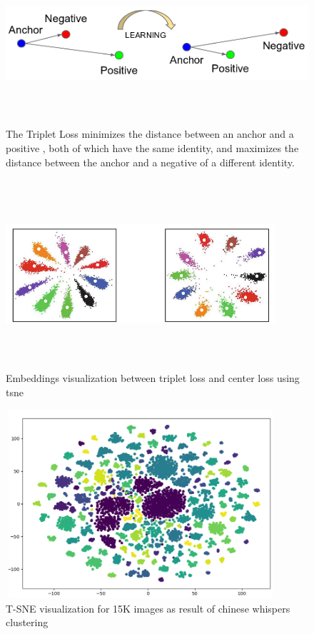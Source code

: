\documentclass[a4paper,12pt, twoside]{NITKReport}
\begin{document}
\begin{figure}[h]
\centering
    \includegraphics[height=6cm,width=13cm]{Selection_034.png}
    \caption{The Triplet Loss minimizes the distance between an anchor and a positive , both of which have the same identity, and maximizes the distance between the anchor and a negative of a different identity.}
    \label{triplet}
 
\end{figure}

\begin{figure} [h]
\centering
    \includegraphics[height=7cm,width=10cm]{embeddings.png}
    \caption{Embeddings visualization between triplet loss and center loss using tsne}
    \label{embedding_vis}
\end{figure}

\begin{figure} [h]
\centering
    \includegraphics[height=7cm,width=10cm]{tsne_15k.png}
    \caption{T-SNE visualization for 15K images as result of chinese whispers clustering}
    \label{tsne}
\end{figure}
\end{document}
